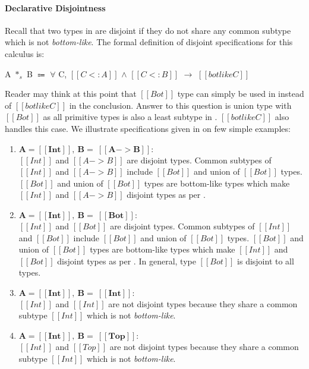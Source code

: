 \paragraph{Declarative Disjointness}
Recall that two types in \cal are disjoint if they do not share any common subtype which is not
\emph{bottom-like}. The formal definition of disjoint specifications for this calculus is:

\begin{definition}
  A $*_s$ B $\Coloneqq$ $\forall$ C, $[[C <: A]]$ $\wedge$ $[[C <: B]]$ $\rightarrow$ $[[botlike C]]$
\label{def:union:disj}
\end{definition}

\noindent Reader may think at this point that $[[Bot]]$ type can simply be used in 
instead of $[[botlike C]]$ in the conclusion. Answer to this question is
union type with $[[Bot]]$ as all primitive types is also a least subtype in \cal.
$[[botlike C]]$ also handles this case.
We illustrate specifications given in  on few simple examples:

\begin{enumerate}
  \item $\boldsymbol{A = [[Int]], \ B = \ [[A -> B]]:}$ \\
        $[[Int]]$ and $[[A -> B]]$ are disjoint types. Common subtypes of $[[Int]]$ and $[[A -> B]]$
        include $[[Bot]]$ and union of $[[Bot]]$ types. $[[Bot]]$ and union of $[[Bot]]$ types are
        bottom-like types which make $[[Int]]$ and $[[A -> B]]$ disjoint types as per .
  \item $\boldsymbol{A = [[Int]], \ B = \ [[Bot]]:}$ \\
        $[[Int]]$ and $[[Bot]]$ are disjoint types. Common subtypes of $[[Int]]$ and $[[Bot]]$
        include $[[Bot]]$ and union of $[[Bot]]$ types. $[[Bot]]$ and union of $[[Bot]]$ types are
        bottom-like types which make $[[Int]]$ and $[[Bot]]$ disjoint types as per .
        In general, type $[[Bot]]$ is disjoint to all types.
  \item $\boldsymbol{A = [[Int]], \ B = \ [[Int]]:}$ \\
        $[[Int]]$ and $[[Int]]$ are not disjoint types because they share a common subtype $[[Int]]$ which
        is not \emph{bottom-like}.
  \item $\boldsymbol{A = [[Int]], \ B = \ [[Top]]:}$ \\
        $[[Int]]$ and $[[Top]]$ are not disjoint types because they share a common
        subtype $[[Int]]$ which is not \emph{bottom-like}.
\end{enumerate}

